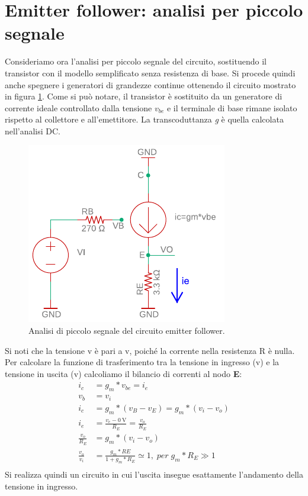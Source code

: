\section{Emitter follower: analisi per piccolo segnale}
Consideriamo ora l'analisi per piccolo segnale del circuito, sostituendo il transistor con il modello semplificato senza resistenza di base. Si procede quindi anche spegnere i generatori di grandezze continue ottenendo il circuito mostrato in figura \ref{fig:emitterfollwer_piccolo segnale}. Come si può notare, il transistor è sostituito da un generatore di corrente ideale controllato dalla tensione $v_{be}$ e il terminale di base rimane isolato rispetto al collettore e all'emettitore. La transcoduttanza \textit{g} è quella calcolata nell'analisi DC.
\begin{figure}[h!]
	\centering
	\includegraphics[width=0.4\linewidth]{./OtherFiles/Laboratorio 1/emitter follower_piccolo segnale_printout}
	\caption{Analisi di piccolo segnale del circuito emitter follower.}
	\label{fig:emitterfollwer_piccolo segnale}
\end{figure}
Si noti che la tensione v è pari a v, poiché la corrente nella resistenza R è nulla.
Per calcolare la funzione di trasferimento tra la tensione in ingresso (v) e la tensione in uscita (v) calcoliamo il bilancio di correnti al nodo \textbf{E}:
\begin{equation}
	\begin{split}
		i_c&=g_m * v_{be} = i_e \\ 
		v_b&=v_i \\
		i_c&=g_m*(v_B-v_E)=g_m*(v_i-v_o) \\
		i_e&=\frac{v_e-\SI{0}{\volt}}{R_E}=\frac{v_o}{R_E} \\
		\frac{v_o}{R_E}&=g_m*(v_i-v_o) \\
		\frac{v_o}{v_i}&=\frac{g_m*RE}{1+g_m*R_E}\simeq 1, \; per \; g_m*R_E\gg 1 \\
	\end{split}
\end{equation}
Si realizza quindi un circuito in cui l'uscita insegue esattamente l'andamento della tensione in ingresso.

